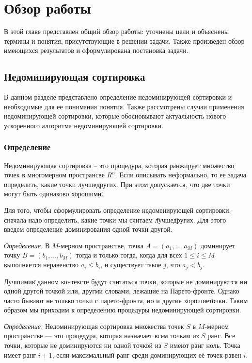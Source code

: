 
\chapter{Обзор работы}
\label{chapter1}

В этой главе представлен общий обзор работы: уточнены цели и объяснены термины и понятия, присутствующие в решении
задачи. Также произведен обзор имеющихся результатов и сформулирована постановка задачи.

\section{Недоминирующая сортировка}

В данном разделе представлено определение недоминирующей сортировки и необходимые для ее понимания понятия.
Также рассмотрены случаи применения недоминирующей сортировки, которые обосновывают актуальность нового ускоренного
алгоритма недоминирующей сортировки.

\subsection{Определение}

Недоминирующая сортировка -- это процедура, которая ранжирует множество точек в многомерном пространсве $R^n$.
Если описывать неформально, то ее задача определить, какие точки \"лучше\" других. При этом допускается, что две точки 
могут быть одинаково \"хорошими\".

Для того, чтобы сформулировать определение недоменирующей сортировки, сначала надо определить, какие точки мы считаем 
\"лучше\" других. Для этого введем определение доминирования одной точки другой.

\textit{Определение.} В $M$-мерном пространстве, точка $A = (a_1,...,a_M)$ доминирует точку $B = (b_1,...,b_M)$
 тогда и только тогда, когда для всех $1 \leq i \leq M$ выполняется неравенство $a_i\leq b_i$, и существует такое $j$,
 что $a_j < b_j$.

\"Лучшими\" в данном контексте будут считаться точки, которые не доминируются ни одной другой точкой или, другми словами, 
лежащие на Парето-фронте. Однако часто бывают не только точки с парето-фронта, но и другие \"хорошие\" точки. Таким
образом мы приходим к определению процедуры недоминирующей сортировки.

\textit{Определение.} Недоминирующая сортировка множества точек $S$ в $M$-мерном пространстве — это процедура, которая 
назначает всем точкам из $S$ ранг. Все точки, которые не доминируются ни одной точкой из $S$ имеют ранг ноль. Точка 
имеет ранг $i+1$, если максимальный ранг среди доминирующих её точек равен $i$.

